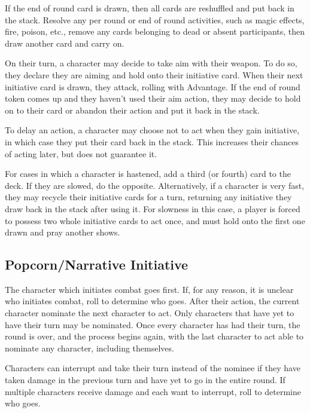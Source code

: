 \documentclass[twoside]{article}
\begin{document}
\bigbreak

If the end of round card is drawn, then all cards are reshuffled and put back in the stack. Resolve any per round or end of round activities, such as magic effects, fire, poison, etc., remove any cards belonging to dead or absent participants, then draw another card and carry on.

\bigbreak

On their turn, a character may decide to take aim with their weapon. To do so, they declare they are aiming and hold onto their initiative card. When their next initiative card is drawn, they attack, rolling with Advantage. If the end of round token comes up and they haven’t used their aim action, they may decide to hold on to their card or abandon their action and put it back in the stack.

\bigbreak

To delay an action, a character may choose not to act when they gain initiative, in which case they put their card back in the stack. This increases their chances of acting later, but does not guarantee it.

\bigbreak

For cases in which a character is hastened, add a third (or fourth) card to the deck. If they are slowed, do the opposite. Alternatively, if a character is very fast, they may recycle their initiative cards for a turn, returning any initiative they draw back in the stack after using it. For slowness in this case, a player is forced to possess two whole initiative cards to act once, and must hold onto the first one drawn and pray another shows.

\subsection*{Popcorn/Narrative Initiative}

The character which initiates combat goes first. If, for any reason, it is unclear who initiates combat, roll to determine who goes. After their action, the current character nominate the next character to act. Only characters that have yet to have their turn may be nominated. Once every character has had their turn, the round is over, and the process begins again, with the last character to act able to nominate any character, including themselves.

\bigbreak

Characters can interrupt and take their turn instead of the nominee if they have taken damage in the previous turn and have yet to go in the entire round. If multiple characters receive damage and each want to interrupt, roll to determine who goes.
\end{document}
